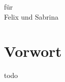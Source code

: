 \vspace*{\fill}

\begin{center}
für \\
Felix und Sabrina
\end{center}

\vspace*{\fill}

\cleardoublepage

\section*{Vorwort} %
\label{sec:vorwort}

todo 
